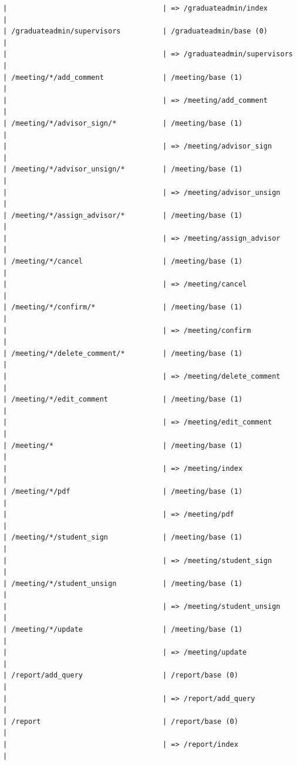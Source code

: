 \documentclass{journal}
\begin{document}
\begin{verbatim}
|                                     | => /graduateadmin/index              |
| /graduateadmin/supervisors          | /graduateadmin/base (0)              |
|                                     | => /graduateadmin/supervisors        |
| /meeting/*/add_comment              | /meeting/base (1)                    |
|                                     | => /meeting/add_comment              |
| /meeting/*/advisor_sign/*           | /meeting/base (1)                    |
|                                     | => /meeting/advisor_sign             |
| /meeting/*/advisor_unsign/*         | /meeting/base (1)                    |
|                                     | => /meeting/advisor_unsign           |
| /meeting/*/assign_advisor/*         | /meeting/base (1)                    |
|                                     | => /meeting/assign_advisor           |
| /meeting/*/cancel                   | /meeting/base (1)                    |
|                                     | => /meeting/cancel                   |
| /meeting/*/confirm/*                | /meeting/base (1)                    |
|                                     | => /meeting/confirm                  |
| /meeting/*/delete_comment/*         | /meeting/base (1)                    |
|                                     | => /meeting/delete_comment           |
| /meeting/*/edit_comment             | /meeting/base (1)                    |
|                                     | => /meeting/edit_comment             |
| /meeting/*                          | /meeting/base (1)                    |
|                                     | => /meeting/index                    |
| /meeting/*/pdf                      | /meeting/base (1)                    |
|                                     | => /meeting/pdf                      |
| /meeting/*/student_sign             | /meeting/base (1)                    |
|                                     | => /meeting/student_sign             |
| /meeting/*/student_unsign           | /meeting/base (1)                    |
|                                     | => /meeting/student_unsign           |
| /meeting/*/update                   | /meeting/base (1)                    |
|                                     | => /meeting/update                   |
| /report/add_query                   | /report/base (0)                     |
|                                     | => /report/add_query                 |
| /report                             | /report/base (0)                     |
|                                     | => /report/index                     |

\end{verbatim}
\end{document}
